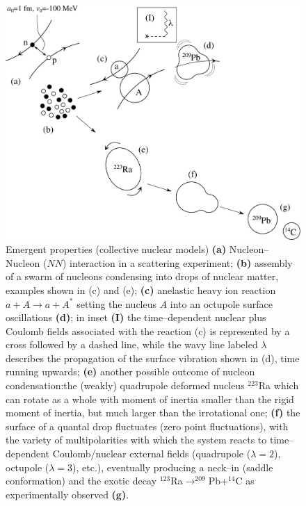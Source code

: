 \documentclass[a4paper,11pt]{book}
\numberwithin{equation}{section}
\numberwithin{figure}{section}
\numberwithin{table}{section}
\begin{document}
\begin{figure}
\centerline {
\includegraphics*[width=12cm]{introduccion/figs/figpreface2x}
}
\caption{Emergent properties (collective nuclear models) \textbf{(a)} Nucleon--Nucleon ($NN$) interaction in a scattering experiment; \textbf{(b)} assembly of a swarm of nucleons condensing into drops of nuclear matter, examples shown in (c) and (e); \textbf{(c)} anelastic heavy ion reaction $a+A\to a+A^*$ setting the nucleus $A$ into an octupole surface oscillations \textbf{(d)}; in inset \textbf{(I)} the time--dependent nuclear plus Coulomb fields associated with the reaction (c) is represented by a cross followed by a dashed line, while the wavy line labeled $\lambda$ describes the propagation of the surface vibration shown in (d), time running upwards; \textbf{(e)} another possible outcome of nucleon condensation:the (weakly) quadrupole deformed nucleus $^{223}$Ra which can rotate as a whole with moment of inertia smaller than the rigid moment of inertia, but much larger than the irrotational one; \textbf{(f)} the surface of a quantal drop fluctuates (zero point fluctuations), with the variety of multipolarities with which the system reacts to time--dependent Coulomb/nuclear external fields (quadrupole ($\lambda=2$), octupole ($\lambda=3$), etc.), eventually producing a neck--in (saddle conformation) and the exotic decay $^{123}$Ra$\to^{209}$Pb+$^{14}$C as experimentally observed \textbf{(g)}.}
\label{fig1.0.2}
\end{figure}
\end{document}
